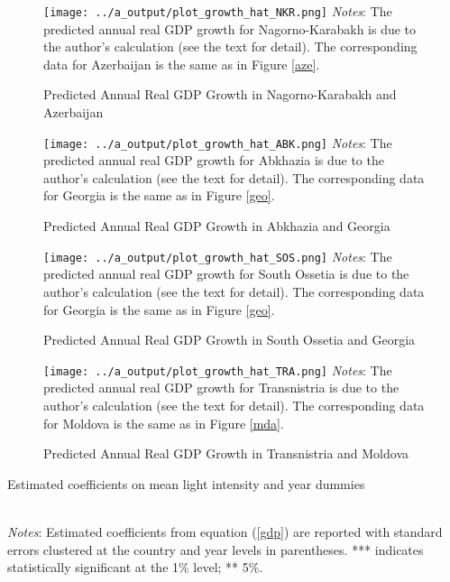 \documentclass[12pt,a4paper]{article}%
\begin{document}
\begin{figure}[ptb]
\caption{Predicted Annual Real GDP Growth in Nagorno-Karabakh and Azerbaijan}%
\label{nkr}%
\texttt{[image: ../a\_output/plot\_growth\_hat\_NKR.png]}
{\scriptsize \textit{Notes}: 
	The predicted annual real GDP growth for Nagorno-Karabakh is due to the author's calculation (see the text for detail).
	The corresponding data for Azerbaijan is the same as in Figure \ref{aze}.
}
\end{figure}

\begin{figure}[ptb]
\caption{Predicted Annual Real GDP Growth in Abkhazia and Georgia}%
\label{abk}%
\texttt{[image: ../a\_output/plot\_growth\_hat\_ABK.png]}
{\scriptsize \textit{Notes}: 
	The predicted annual real GDP growth for Abkhazia is due to the author's calculation (see the text for detail).
	The corresponding data for Georgia is the same as in Figure \ref{geo}.
}
\end{figure}

\begin{figure}[ptb]
\caption{Predicted Annual Real GDP Growth in South Ossetia and Georgia}%
\label{sos}%
\texttt{[image: ../a\_output/plot\_growth\_hat\_SOS.png]}
{\scriptsize \textit{Notes}: 
	The predicted annual real GDP growth for South Ossetia is due to the author's calculation (see the text for detail).
	The corresponding data for Georgia is the same as in Figure \ref{geo}.
}
\end{figure}

\begin{figure}[ptb]
\caption{Predicted Annual Real GDP Growth in Transnistria and Moldova}%
\label{tra}%
\texttt{[image: ../a\_output/plot\_growth\_hat\_TRA.png]}
{\scriptsize \textit{Notes}: 
	The predicted annual real GDP growth for Transnistria is due to the author's calculation (see the text for detail).
	The corresponding data for Moldova is the same as in Figure \ref{mda}.
}
\end{figure}

\begin{table}[ptb]
\caption{Estimated coefficients on mean light intensity and year dummies}%
\label{estimates}%
\\
{\scriptsize \textit{Notes}: 
	Estimated coefficients from equation (\ref{gdp}) are reported with standard errors clustered at the country and year levels in parentheses. *** indicates statistically significant at the 1\% level; ** 5\%.
}
\end{table}
\end{document}
